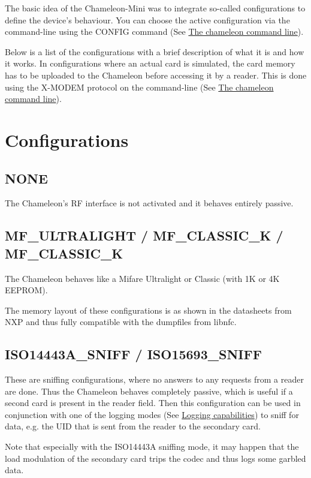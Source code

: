 The basic idea of the Chameleon-\/\-Mini was to integrate so-\/called configurations to define the device's behaviour. You can choose the active configuration via the command-\/line using the {\ttfamily C\-O\-N\-F\-I\-G} command (See \hyperlink{Page_CommandLine}{The chameleon command line}).

Below is a list of the configurations with a brief description of what it is and how it works. In configurations where an actual card is simulated, the card memory has to be uploaded to the Chameleon before accessing it by a reader. This is done using the X-\/\-M\-O\-D\-E\-M protocol on the command-\/line (See \hyperlink{Page_CommandLine}{The chameleon command line}).

\section*{Configurations }

\subsection*{{\ttfamily N\-O\-N\-E} }

The Chameleon's R\-F interface is not activated and it behaves entirely passive.

\subsection*{{\ttfamily M\-F\-\_\-\-U\-L\-T\-R\-A\-L\-I\-G\-H\-T} / {\ttfamily M\-F\-\_\-\-C\-L\-A\-S\-S\-I\-C\-\_\-K} / {\ttfamily M\-F\-\_\-\-C\-L\-A\-S\-S\-I\-C\-\_\-K} }

The Chameleon behaves like a Mifare Ultralight or Classic (with 1\-K or 4\-K E\-E\-P\-R\-O\-M).

The memory layout of these configurations is as shown in the datasheets from N\-X\-P and thus fully compatible with the dumpfiles from libnfc.

\subsection*{{\ttfamily I\-S\-O14443\-A\-\_\-\-S\-N\-I\-F\-F} / {\ttfamily I\-S\-O15693\-\_\-\-S\-N\-I\-F\-F} }

These are sniffing configurations, where no answers to any requests from a reader are done. Thus the Chameleon behaves completely passive, which is useful if a second card is present in the reader field. Then this configuration can be used in conjunction with one of the logging modes (See \hyperlink{Page_Logging}{Logging capabilities}) to sniff for data, e.\-g. the U\-I\-D that is sent from the reader to the secondary card.

Note that especially with the I\-S\-O14443\-A sniffing mode, it may happen that the load modulation of the secondary card trips the codec and thus logs some garbled data. 